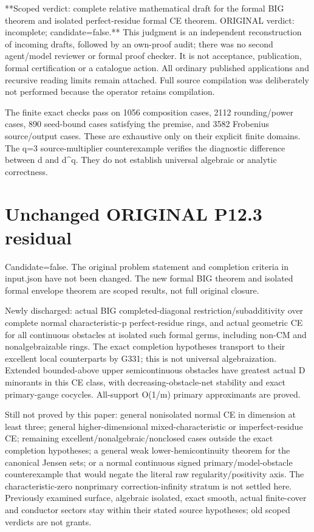 \documentclass[11pt]{article}
\begin{document}
**Scoped verdict: complete relative mathematical draft for the formal BIG theorem and isolated perfect-residue formal CE theorem. ORIGINAL verdict: incomplete; candidate=false.** This judgment is an independent reconstruction of incoming drafts, followed by an own-proof audit; there was no second agent/model reviewer or formal proof checker. It is not acceptance, publication, formal certification or a catalogue action. All ordinary published applications and recursive reading limits remain attached. Full source compilation was deliberately not performed because the operator retains compilation.

The finite exact checks pass on 1056 composition cases, 2112 rounding/power cases, 890 seed-bound cases satisfying the premise, and 3582 Frobenius source/output cases. These are exhaustive only on their explicit finite domains. The q=3 source-multiplier counterexample verifies the diagnostic difference between d and d\textasciicircum{}q. They do not establish universal algebraic or analytic correctness.

\section{Unchanged ORIGINAL P12.3 residual}

Candidate=false. The original problem statement and completion criteria in input.json have not been changed. The new formal BIG theorem and isolated formal envelope theorem are scoped results, not full original closure.

Newly discharged: actual BIG completed-diagonal restriction/subadditivity over complete normal characteristic-p perfect-residue rings, and actual geometric CE for all continuous obstacles at isolated such formal germs, including non-CM and nonalgebraizable rings. The exact completion hypotheses transport to their excellent local counterparts by G331; this is not universal algebraization. Extended bounded-above upper semicontinuous obstacles have greatest actual D minorants in this CE class, with decreasing-obstacle-net stability and exact primary-gauge cocycles. All-support O(1/m) primary approximants are proved.

Still not proved by this paper: general nonisolated normal CE in dimension at least three; general higher-dimensional mixed-characteristic or imperfect-residue CE; remaining excellent/nonalgebraic/nonclosed cases outside the exact completion hypotheses; a general weak lower-hemicontinuity theorem for the canonical Jensen sets; or a normal continuous signed primary/model-obstacle counterexample that would negate the literal raw regularity/positivity axis. The characteristic-zero nonprimary correction-infinity stratum is not settled here. Previously examined surface, algebraic isolated, exact smooth, actual finite-cover and conductor sectors stay within their stated source hypotheses; old scoped verdicts are not grants.
\end{document}
